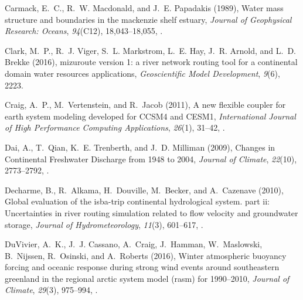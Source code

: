 \documentclass[jgrga, draft]{agutex}
\begin{document}
\begin{article}
\begin{thebibliography}{79}
Carmack, E.~C., R.~W. Macdonald, and J.~E. Papadakis (1989), Water mass
  structure and boundaries in the mackenzie shelf estuary, \textit{Journal of
  Geophysical Research: Oceans}, \textit{94}(C12), 18,043--18,055,
  .


Clark, M.~P., R.~J. Viger, S.~L. Markstrom, L.~E. Hay, J.~R. Arnold, and L.~D.
  Brekke (2016), mizuroute version 1: a river network routing tool for a
  continental domain water resources applications, \textit{Geoscientific Model
  Development}, \textit{9}(6), 2223.

Craig, A.~P., M.~Vertenstein, and R.~Jacob (2011), {A new flexible coupler for
  earth system modeling developed for {CCSM}4 and {CESM}1},
  \textit{International Journal of High Performance Computing Applications},
  \textit{26}(1), 31--42, .

Dai, A., T.~Qian, K.~E. Trenberth, and J.~D. Milliman (2009), {Changes in
  Continental Freshwater Discharge from 1948 to 2004}, \textit{Journal of
  Climate}, \textit{22}(10), 2773--2792, .

Decharme, B., R.~Alkama, H.~Douville, M.~Becker, and A.~Cazenave (2010), Global
  evaluation of the isba-trip continental hydrological system. part ii:
  Uncertainties in river routing simulation related to flow velocity and
  groundwater storage, \textit{Journal of Hydrometeorology}, \textit{11}(3),
  601--617, .

DuVivier, A.~K., J.~J. Cassano, A.~Craig, J.~Hamman, W.~Maslowski, B.~Nijssen,
  R.~Osinski, and A.~Roberts (2016), Winter atmospheric buoyancy forcing and
  oceanic response during strong wind events around southeastern greenland in
  the regional arctic system model (rasm) for 1990–2010, \textit{Journal of
  Climate}, \textit{29}(3), 975--994, .


\end{thebibliography}
\end{article}
\end{document}
